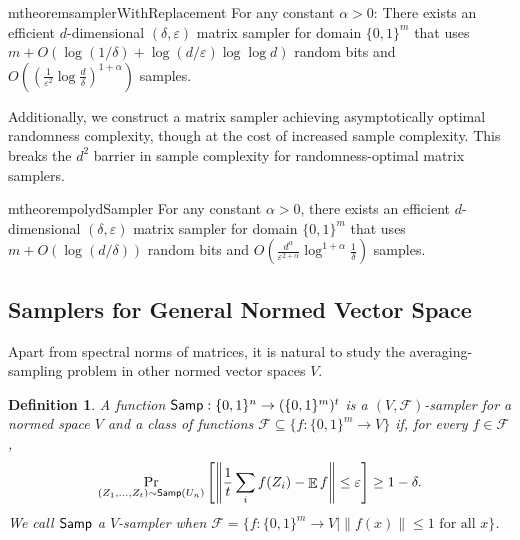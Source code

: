 \documentclass[10pt,a4paper]{article}
\newtheorem{definition}[theorem]{Definition}
\newcommand{\C}{\mathbb{C}}
\DeclareMathOperator*{\E}{\mathbb{E}}
\newcommand{\eps}{\varepsilon}
\newcommand{\1}{\mathbbm{1}}
\newcommand{\norm}[1]{\left\lVert #1\right\rVert}
\newcommand{\zo}{\{0, 1\}}
\newcommand{\Smp}{\textup{\textsf{Samp}}}
\begin{document}
\begin{restatable}{mtheorem}{samplerWithReplacement}
 \label{thm:sampler_with_replacement}
    For any constant $\alpha > 0$:
    There exists an efficient $d$-dimensional $(\delta, \eps)$ matrix sampler for domain $\zo^m$ that uses $m + O(\log(1 / \delta) + \log(d / \eps) \log\log d)$ random bits and $O((\frac{1}{\eps^2}\log\frac{d}{\delta})^{1 + \alpha})$ samples.   
\end{restatable}


Additionally, we construct a matrix sampler achieving asymptotically optimal randomness complexity, though at the cost of increased sample complexity. This breaks the $d^2$ barrier in sample complexity for randomness-optimal matrix samplers.


\begin{restatable}{mtheorem}{polydSampler}
    \label{thm:polydSampler}
        For any constant $\alpha > 0$,  there exists an efficient $d$-dimensional $(\delta, \eps)$ matrix sampler for domain $\zo^m$ that uses $m + O(\log (d / \delta))$ random bits and $O(\frac{d^\alpha}{\eps^{2+\alpha}}\log^{1+\alpha}\frac{1}{\delta})$ samples.
\end{restatable}


\subsection{Samplers for General Normed Vector Space}
Apart from spectral norms of matrices, it is natural to study the averaging-sampling problem in other normed vector spaces \(V\).


\begin{definition}
    A function \(\Smp : \zo^n \to (\zo^m)^t\) is a \((V,\mathcal{F})\)-sampler for a normed space \(V\) and a class of functions \(\mathcal{F} \subseteq \{f:\zo^m \to V\}\) if, for every \(f \in \mathcal{F}\),
    \[
    \Pr_{(Z_1, \dots, Z_t) \sim \Smp(U_n)}
    \left[ \norm{\frac{1}{t}  \sum_i f(Z_i) - \E f} \leq \varepsilon \right]
    \geq 1 - \delta.
    \]
    We call \(\Smp\) a \(V\)-sampler when \(\mathcal{F} = \{f:\zo^m \to V \mid \|f(x)\|\le 1 \text{ for all } x\}\).
\end{definition}

\end{document}
